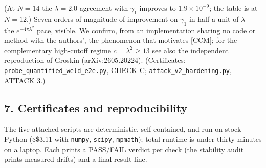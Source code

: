 \documentclass[
  letterpaper,
  11pt]{article}
\theoremstyle{plain}
\theoremstyle{definition}
\theoremstyle{remark}
\begin{document}
(At \(N = 14\) the \(\lambda = 2.0\) agreement with \(\gamma_1\) improves to \(1.9\times10^{-9}\); the table is at \(N = 12\).) Seven orders of magnitude of improvement on \(\gamma_1\) in half a unit of \(\lambda\) --- the \(e^{-4\pi\lambda^2}\) pace, visible. We confirm, from an implementation sharing no code or method with the authors', the phenomenon that motivates {[}CCM{]}; for the complementary high-cutoff regime \(c = \lambda^2 \ge 13\) see also the independent reproduction of Groskin (arXiv:2605.20224). (Certificates: \texttt{probe\_quantified\_weld\_e2e.py}, CHECK C; \texttt{attack\_v2\_hardening.py}, ATTACK 3.)

\subsection{7. Certificates and reproducibility}\label{certificates-and-reproducibility}

The five attached scripts are deterministic, self-contained, and run on stock Python (\$\ge\$3.11 with \texttt{numpy}, \texttt{scipy}, \texttt{mpmath}); total runtime is under thirty minutes on a laptop. Each prints a PASS/FAIL verdict per check (the stability audit prints measured drifts) and a final result line.
\end{document}
